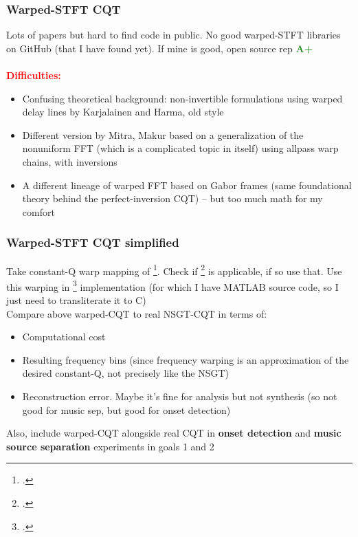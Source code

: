 \documentclass[usenames,dvipsnames]{beamer}
\begin{document}
\begin{frame}
	\frametitle{Warped-STFT CQT}
	Lots of papers but hard to find code in public. No good warped-STFT libraries on GitHub (that I have found yet). If mine is good, open source rep \textcolor{ForestGreen}{\textbf{A+}}\\\ \\
	\textcolor{red}{\textbf{Difficulties:}}
	\begin{itemize}
		\item
			Confusing theoretical background: non-invertible formulations using warped delay lines by Karjalainen and Harma, old style
		\item
			Different version by Mitra, Makur based on a generalization of the nonuniform FFT (which is a complicated topic in itself) using allpass warp chains, with inversions
		\item
			A different lineage of warped FFT based on Gabor frames (same foundational theory behind the perfect-inversion CQT) -- but too much math for my comfort
	\end{itemize}
\end{frame}

\begin{frame}
	\frametitle{Warped-STFT CQT simplified}
	Take constant-Q warp mapping of \footcite{cqwarp}. Check if \footcite{betterwarp} is applicable, if so use that. Use this warping in \footcite{makur2008} implementation (for which I have MATLAB source code, so I just need to transliterate it to C)\\
	Compare above warped-CQT to real NSGT-CQT in terms of:
	\begin{itemize}
		\item
			Computational cost
		\item
			Resulting frequency bins (since frequency warping is an approximation of the desired constant-Q, not precisely like the NSGT)
		\item
			Reconstruction error. Maybe it's fine for analysis but not synthesis (so not good for music sep, but good for onset detection)
	\end{itemize}

	Also, include warped-CQT alongside real CQT in \textbf{onset detection} and \textbf{music source separation} experiments in goals 1 and 2
\end{frame}
\end{document}
